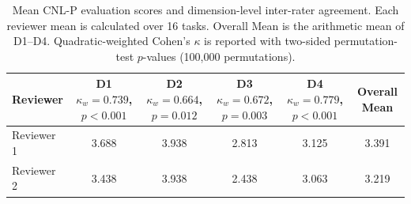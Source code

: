 \begin{table}[t]
\centering
\caption{Mean CNL-P evaluation scores and dimension-level inter-rater agreement. Each reviewer mean is calculated over 16 tasks. Overall Mean is the arithmetic mean of D1--D4. Quadratic-weighted Cohen's $\kappa$ is reported with two-sided permutation-test $p$-values (100,000 permutations).}
\label{tab:cnlp-human-evaluation}
\begin{tabular}{lccccc}
\toprule
Reviewer & \shortstack{D1\\$\kappa_w=0.739$, $p<0.001$} & \shortstack{D2\\$\kappa_w=0.664$, $p=0.012$} & \shortstack{D3\\$\kappa_w=0.672$, $p=0.003$} & \shortstack{D4\\$\kappa_w=0.779$, $p<0.001$} & Overall Mean \\
\midrule
Reviewer 1 & 3.688 & 3.938 & 2.813 & 3.125 & 3.391 \\
Reviewer 2 & 3.438 & 3.938 & 2.438 & 3.063 & 3.219 \\
\bottomrule
\end{tabular}
\end{table}

